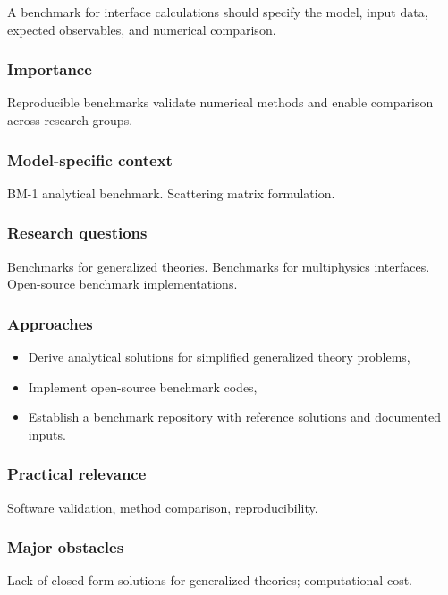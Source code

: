 A benchmark for interface calculations should specify the model, input data, expected observables, and numerical comparison.

\subsubsection{Importance}

Reproducible benchmarks validate numerical methods and enable comparison across research groups.

\subsubsection{Model-specific context}

BM-1 analytical benchmark. Scattering matrix formulation.

\subsubsection{Research questions}

Benchmarks for generalized theories. Benchmarks for multiphysics interfaces. Open-source benchmark implementations.

\subsubsection{Approaches}

\begin{itemize}
\item Derive analytical solutions for simplified generalized theory problems,
\item Implement open-source benchmark codes,
\item Establish a benchmark repository with reference solutions and documented inputs.
\end{itemize}

\subsubsection{Practical relevance}

Software validation, method comparison, reproducibility.

\subsubsection{Major obstacles}

Lack of closed-form solutions for generalized theories; computational cost.

